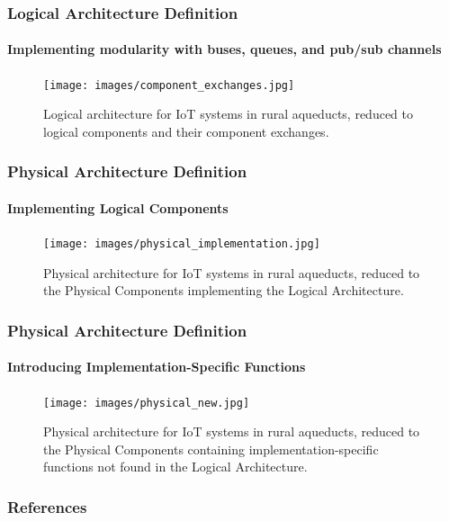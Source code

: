 \documentclass{beamer}
\begin{document}
\begin{frame}
    \frametitle{\small Logical Architecture Definition}
    \framesubtitle{Implementing modularity with buses, queues, and pub/sub channels}

    \begin{figure}
        \centering
        \texttt{[image: images/component\_exchanges.jpg]}
        \caption{Logical architecture for IoT systems in rural aqueducts, reduced to logical components and their component exchanges.}
    \end{figure}
\end{frame}

\begin{frame}
    \frametitle{\small Physical Architecture Definition}
    \framesubtitle{Implementing Logical Components}

    \begin{figure}
        \centering
        \texttt{[image: images/physical\_implementation.jpg]}
        \caption{Physical architecture for IoT systems in rural aqueducts, reduced to the Physical Components implementing the Logical Architecture.}
    \end{figure}
\end{frame}

\begin{frame}
    \frametitle{\small Physical Architecture Definition}
    \framesubtitle{Introducing Implementation-Specific Functions}

    \begin{figure}
        \centering
        \texttt{[image: images/physical\_new.jpg]}
        \caption{Physical architecture for IoT systems in rural aqueducts, reduced to the Physical Components containing implementation-specific functions not found in the Logical Architecture.}
    \end{figure}
\end{frame}

\begin{frame}
    \frametitle{References}
    
    
\end{frame}
\end{document}
